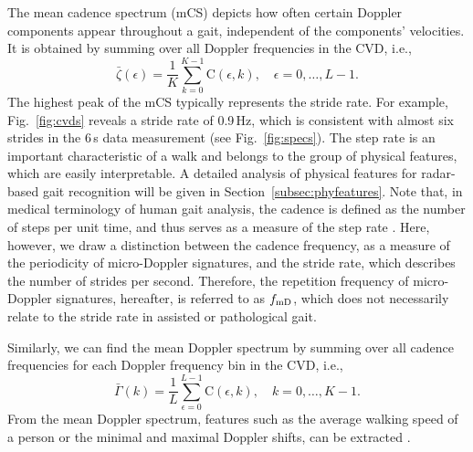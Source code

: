 The mean cadence spectrum (mCS) depicts how often certain Doppler components appear throughout a gait, independent of the components' velocities. It is obtained by summing over all Doppler frequencies in the CVD, i.e., \cite{Bjoe15,Ric15}
\begin{equation}\label{eq:meanCS}
\bar{\zeta}(\epsilon) = \frac{1}{K} \sum_{k=0}^{K-1} \mathrm{C}(\epsilon,k), \quad \epsilon = 0, \dots, L-1.
\end{equation}
The highest peak of the mCS typically represents the stride rate. For example, Fig.~\ref{fig:cvds} reveals a stride rate of 0.9\,Hz, which is consistent with almost six strides in the 6\,s data measurement (see Fig.~\ref{fig:specs}). The step rate is an important characteristic of a walk and belongs to the group of physical features, which are easily interpretable. A detailed analysis of physical features for radar-based gait recognition will be given in Section~\ref{subsec:phyfeatures}. Note that, in medical terminology of human gait analysis, the cadence is defined as the number of steps per unit time, and thus serves as a measure of the step rate \cite{Lev12}. Here, however, we draw a distinction between the cadence frequency, as a measure of the periodicity of micro-Doppler signatures, and the stride rate, which describes the number of strides per second. Therefore, the repetition frequency of micro-Doppler signatures, hereafter, is referred to as ${f_\text{mD}}$, which does not necessarily relate to the stride rate in assisted or pathological gait. 

Similarly, we can find the mean Doppler spectrum by summing over all cadence frequencies for each Doppler frequency bin in the CVD, i.e.,
\begin{equation}\label{eq:meanDS}
\bar{\Gamma}(k) = \frac{1}{L} \sum_{\epsilon=0}^{L-1} \mathrm{C}(\epsilon,k), \quad k = 0, \dots, K-1.
\end{equation}
From the mean Doppler spectrum, features such as the average walking speed of a person or the minimal and maximal Doppler shifts, can be extracted \cite{Ric15,Bjoe12}.
